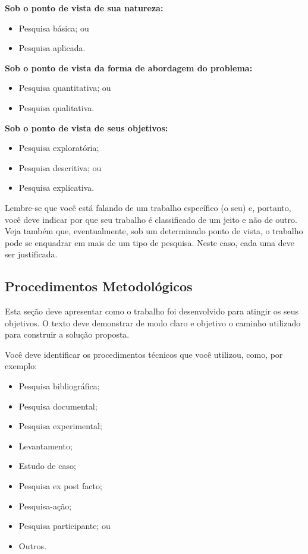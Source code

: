 \textbf{Sob o ponto de vista de sua natureza:} 
\begin{itemize}
    \item Pesquisa básica; ou

    \item Pesquisa aplicada.
\end{itemize}

\textbf{Sob o ponto de vista da forma de abordagem do problema:}
\begin{itemize}
    \item Pesquisa quantitativa; ou
    
    \item Pesquisa qualitativa.
\end{itemize}

\textbf{Sob o ponto de vista de seus objetivos:}
\begin{itemize}
    \item Pesquisa exploratória;
    
    \item Pesquisa descritiva; ou
    
    \item Pesquisa explicativa.
\end{itemize}
Lembre-se que você está falando de um trabalho específico (o seu) e, portanto, você deve indicar por que seu trabalho é classificado de um jeito e não de outro. Veja também que, eventualmente, sob um determinado ponto de vista, o trabalho pode se enquadrar em mais de um tipo de pesquisa. Neste caso, cada uma deve ser justificada.



\subsection{Procedimentos Metodológicos}
\label{ss_cintro_proced_metodologicos}

Esta seção deve apresentar como o trabalho foi desenvolvido para atingir os seus objetivos. O texto deve demonstrar de modo claro e objetivo o caminho utilizado para construir a solução proposta.

Você deve identificar os procedimentos técnicos que você utilizou, como, por exemplo:

\begin{itemize}
    \item Pesquisa bibliográfica;
    \item Pesquisa documental;
    \item Pesquisa experimental;
    \item Levantamento;
    \item Estudo de caso;
    \item Pesquisa ex post facto;
    \item Pesquisa-ação; 
    \item Pesquisa participante; ou
    \item Outros.
\end{itemize}

